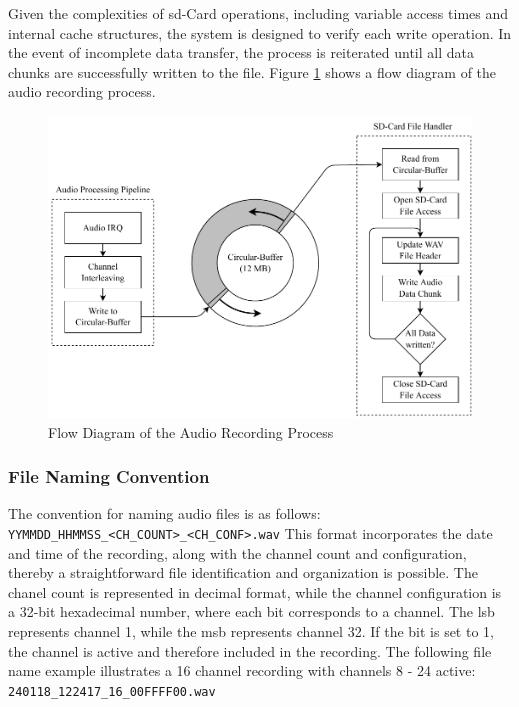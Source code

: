 Given the complexities of \acrshort{sd}-Card operations, including variable access times and internal cache structures, the system is designed to verify each write operation.
In the event of incomplete data transfer, the process is reiterated until all data chunks are successfully written to the file.
Figure \ref{fig:acquisition_system_audio_recording_flow_diagram} shows a flow diagram of the audio recording process.
\begin{figure}[h]
	\centering
	\includegraphics[width=1.0\textwidth, trim={0 0 0 0.5cm}]{images/4_design_acquisition_system/acquisition_system_audio_recording_flow_diagram.pdf}
	\caption{Flow Diagram of the Audio Recording Process}
	\label{fig:acquisition_system_audio_recording_flow_diagram}
\end{figure}

\subsubsection{File Naming Convention}
The convention for naming audio files is as follows:  \smallskip \newline
\texttt{YYMMDD\_HHMMSS\_<CH\_COUNT>\_<CH\_CONF>.wav} \smallskip \newline
This format incorporates the date and time of the recording, along with the channel count and configuration, thereby a straightforward file identification and organization is possible.
The chanel count is represented in decimal format, while the channel configuration is a 32-bit hexadecimal number, where each bit corresponds to a channel.
The \acrfull{lsb} represents channel 1, while the \acrfull{msb} represents channel 32.
If the bit is set to 1, the channel is active and therefore included in the recording.
The following file name example illustrates a 16 channel recording with channels 8 - 24 active:
\texttt{240118\_122417\_16\_00FFFF00.wav}



